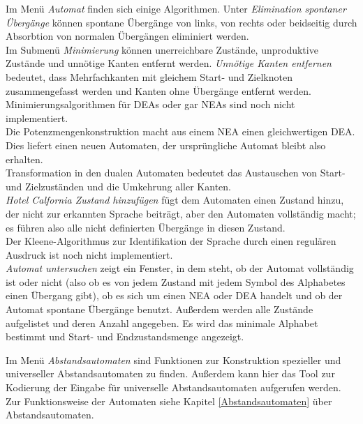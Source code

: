 Im Menü \textit{Automat} finden sich einige Algorithmen. Unter \textit{Elimination spontaner Übergänge} können spontane Übergänge von links, von rechts oder beidseitig durch Absorbtion von normalen Übergängen eliminiert werden.\\
Im Submenü \textit{Minimierung} können unerreichbare Zustände, unproduktive Zustände und unnötige Kanten entfernt werden. \textit{Unnötige Kanten entfernen} bedeutet, dass Mehrfachkanten mit gleichem Start- und Zielknoten zusammengefasst werden und Kanten ohne Übergänge entfernt werden. Minimierungsalgorithmen für DEAs oder gar NEAs sind noch nicht implementiert.\\
Die Potenzmengenkonstruktion macht aus einem NEA einen gleichwertigen DEA. Dies liefert einen neuen Automaten, der ursprüngliche Automat bleibt also erhalten.\\
Transformation in den dualen Automaten bedeutet das Austauschen von Start- und Zielzuständen und die Umkehrung aller Kanten.\\
\textit{Hotel Calfornia Zustand hinzufügen} fügt dem Automaten einen Zustand hinzu, der nicht zur erkannten Sprache beiträgt, aber den Automaten vollständig macht; es führen also alle nicht definierten Übergänge in diesen Zustand.\\
Der Kleene-Algorithmus zur Identifikation der Sprache durch einen regulären Ausdruck ist noch nicht implementiert.\\
\textit{Automat untersuchen} zeigt ein Fenster, in dem steht, ob der Automat vollständig ist oder nicht (also ob es von jedem Zustand mit jedem Symbol des Alphabetes einen Übergang gibt), ob es sich um einen NEA oder DEA handelt und ob der Automat spontane Übergänge benutzt. Außerdem werden alle Zustände aufgelistet und deren Anzahl angegeben. Es wird das minimale Alphabet bestimmt und Start- und Endzustandsmenge angezeigt.

Im Menü \textit{Abstandsautomaten} sind Funktionen zur Konstruktion spezieller und universeller Abstandsautomaten zu finden. Außerdem kann hier das Tool zur Kodierung der Eingabe für universelle Abstandsautomaten aufgerufen werden. Zur Funktionsweise der Automaten siehe Kapitel \ref{Abstandsautomaten} über Abstandsautomaten.
